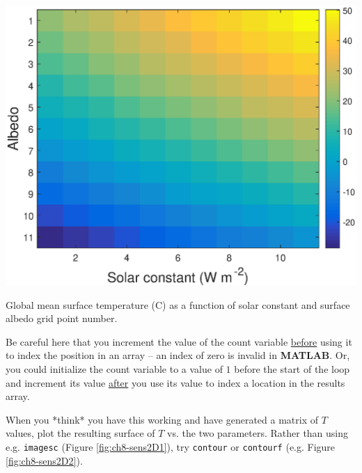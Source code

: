 \documentclass{tufte-book} %
\begin{document}
\begin{marginfigure}[-2.0in]
\includegraphics[width=\linewidth]{ch8-sens2D1.eps}
\caption{Global mean surface temperature (\degree C) as a function of solar constant and surface albedo grid point number.}
\label{fig:ch8-sens2D2}
\end{marginfigure}

Be careful here that you increment the value of the count variable \uline{before} using it to index the position in an array -- an index of zero is invalid in \textbf{MATLAB}. Or, you could initialize the count variable to a value of \(1\) before the start of the loop and increment its value \uline{after} you use its value to index a location in the results array.

When you *think* you have this working and have generated a matrix of \(T\) values, plot the resulting surface of \(T\) vs. the two parameters. Rather than using e.g. \texttt{imagesc} (Figure \ref{fig:ch8-sens2D1}),  try \texttt{contour} or \texttt{contourf} (e.g. Figure \ref{fig:ch8-sens2D2}).
\end{document}

